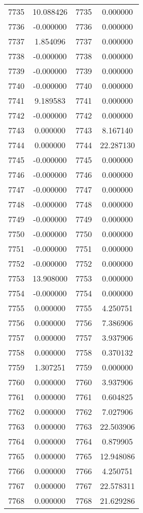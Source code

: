 \documentclass[12pt]{article}
\begin{document}
\begin{longtable}{@{}cccc@{}}
7735 & 10.088426 & 7735 & 0.000000 \\
7736 & -0.000000 & 7736 & 0.000000 \\
7737 & 1.854096 & 7737 & 0.000000 \\
7738 & -0.000000 & 7738 & 0.000000 \\
7739 & -0.000000 & 7739 & 0.000000 \\
7740 & -0.000000 & 7740 & 0.000000 \\
7741 & 9.189583 & 7741 & 0.000000 \\
7742 & -0.000000 & 7742 & 0.000000 \\
7743 & 0.000000 & 7743 & 8.167140 \\
7744 & 0.000000 & 7744 & 22.287130 \\
7745 & -0.000000 & 7745 & 0.000000 \\
7746 & -0.000000 & 7746 & 0.000000 \\
7747 & -0.000000 & 7747 & 0.000000 \\
7748 & -0.000000 & 7748 & 0.000000 \\
7749 & -0.000000 & 7749 & 0.000000 \\
7750 & -0.000000 & 7750 & 0.000000 \\
7751 & -0.000000 & 7751 & 0.000000 \\
7752 & -0.000000 & 7752 & 0.000000 \\
7753 & 13.908000 & 7753 & 0.000000 \\
7754 & -0.000000 & 7754 & 0.000000 \\
7755 & 0.000000 & 7755 & 4.250751 \\
7756 & 0.000000 & 7756 & 7.386906 \\
7757 & 0.000000 & 7757 & 3.937906 \\
7758 & 0.000000 & 7758 & 0.370132 \\
7759 & 1.307251 & 7759 & 0.000000 \\
7760 & 0.000000 & 7760 & 3.937906 \\
7761 & 0.000000 & 7761 & 0.604825 \\
7762 & 0.000000 & 7762 & 7.027906 \\
7763 & 0.000000 & 7763 & 22.503906 \\
7764 & 0.000000 & 7764 & 0.879905 \\
7765 & 0.000000 & 7765 & 12.948086 \\
7766 & 0.000000 & 7766 & 4.250751 \\
7767 & 0.000000 & 7767 & 22.578311 \\
7768 & 0.000000 & 7768 & 21.629286 \\

\end{longtable}
\end{document}
